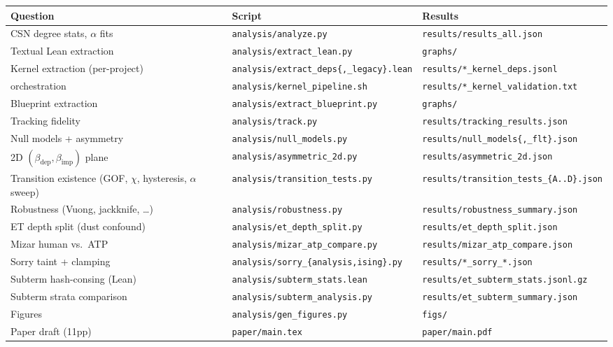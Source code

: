 \documentclass[11pt]{article}
\newcommand{\code}[1]{\texttt{#1}}
\begin{document}
\begin{center}\small
\begin{tabular}{@{}lll@{}}
\toprule
\textbf{Question} & \textbf{Script} & \textbf{Results} \\
\midrule
CSN degree stats, $\alpha$ fits & \code{analysis/analyze.py} & \code{results/results\_all.json} \\
Textual Lean extraction & \code{analysis/extract\_lean.py} & \code{graphs/} \\
Kernel extraction (per-project) & \code{analysis/extract\_deps\{,\_legacy\}.lean} & \code{results/*\_kernel\_deps.jsonl} \\
\quad orchestration & \code{analysis/kernel\_pipeline.sh} & \code{results/*\_kernel\_validation.txt} \\
Blueprint extraction & \code{analysis/extract\_blueprint.py} & \code{graphs/} \\
Tracking fidelity & \code{analysis/track.py} & \code{results/tracking\_results.json} \\
Null models + asymmetry & \code{analysis/null\_models.py} & \code{results/null\_models\{,\_flt\}.json} \\
2D $(\beta_{\mathrm{dep}},\beta_{\mathrm{imp}})$ plane & \code{analysis/asymmetric\_2d.py} & \code{results/asymmetric\_2d.json} \\
Transition existence (GOF, $\chi$, hysteresis, $\alpha$ sweep) & \code{analysis/transition\_tests.py} & \code{results/transition\_tests\_\{A..D\}.json} \\
Robustness (Vuong, jackknife, \dots) & \code{analysis/robustness.py} & \code{results/robustness\_summary.json} \\
ET depth split (dust confound) & \code{analysis/et\_depth\_split.py} & \code{results/et\_depth\_split.json} \\
Mizar human vs.\ ATP & \code{analysis/mizar\_atp\_compare.py} & \code{results/mizar\_atp\_compare.json} \\
Sorry taint + clamping & \code{analysis/sorry\_\{analysis,ising\}.py} & \code{results/*\_sorry\_*.json} \\
Subterm hash-consing (Lean) & \code{analysis/subterm\_stats.lean} & \code{results/et\_subterm\_stats.jsonl.gz} \\
Subterm strata comparison & \code{analysis/subterm\_analysis.py} & \code{results/et\_subterm\_summary.json} \\
Figures & \code{analysis/gen\_figures.py} & \code{figs/} \\
Paper draft (11pp) & \code{paper/main.tex} & \code{paper/main.pdf} \\
\bottomrule
\end{tabular}
\end{center}
\end{document}
